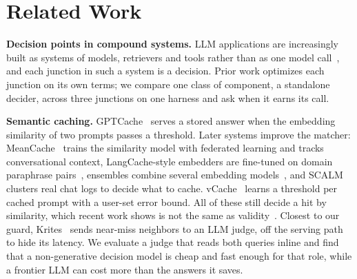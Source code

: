 \section{Related Work}
\label{sec:related}

\textbf{Decision points in compound systems.}
LLM applications are increasingly built as systems of models, retrievers and tools rather than as one model call~\cite{zaharia2024compound}, and each junction in such a system is a decision.
Prior work optimizes each junction on its own terms; we compare one class of component, a standalone decider, across three junctions on one harness and ask when it earns its call.

\textbf{Semantic caching.}
GPTCache~\cite{bang2023gptcache} serves a stored answer when the embedding similarity of two prompts passes a threshold.
Later systems improve the matcher: MeanCache~\cite{gill2025meancache} trains the similarity model with federated learning and tracks conversational context, LangCache-style embedders are fine-tuned on domain paraphrase pairs~\cite{gill2025advancing}, ensembles combine several embedding models~\cite{ghaffari2025ensemble}, and SCALM~\cite{li2024scalm} clusters real chat logs to decide what to cache.
vCache~\cite{schroeder2025vcache} learns a threshold per cached prompt with a user-set error bound.
All of these still decide a hit by similarity, which recent work shows is not the same as validity~\cite{zhang2026similarity}.
Closest to our guard, Krites~\cite{singh2026asynchronous} sends near-miss neighbors to an LLM judge, off the serving path to hide its latency.
We evaluate a judge that reads both queries inline and find that a non-generative decision model is cheap and fast enough for that role, while a frontier LLM can cost more than the answers it saves.

